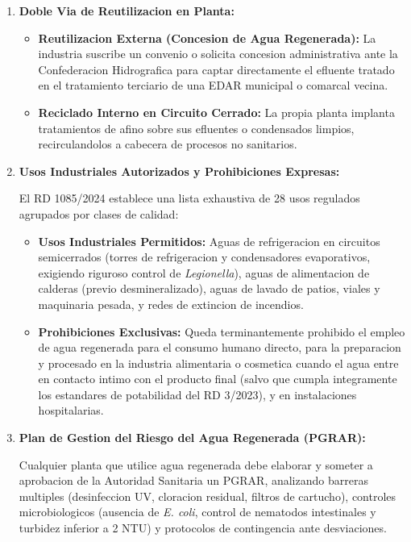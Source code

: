 \documentclass{report}
\begin{document}
\begin{enumerate}

    \item \textbf{Doble Via de Reutilizacion en Planta:}

    \begin{itemize}

        \item \textbf{Reutilizacion Externa (Concesion de Agua Regenerada):} La industria suscribe un convenio o solicita concesion administrativa ante la Confederacion Hidrografica para captar directamente el efluente tratado en el tratamiento terciario de una EDAR municipal o comarcal vecina.

        \item \textbf{Reciclado Interno en Circuito Cerrado:} La propia planta implanta tratamientos de afino sobre sus efluentes o condensados limpios, recirculandolos a cabecera de procesos no sanitarios.

    \end{itemize}

    \item \textbf{Usos Industriales Autorizados y Prohibiciones Expresas:}

    El RD 1085/2024 establece una lista exhaustiva de 28 usos regulados agrupados por clases de calidad:

    \begin{itemize}

        \item \textbf{Usos Industriales Permitidos:} Aguas de refrigeracion en circuitos semicerrados (torres de refrigeracion y condensadores evaporativos, exigiendo riguroso control de \textit{Legionella}), aguas de alimentacion de calderas (previo desmineralizado), aguas de lavado de patios, viales y maquinaria pesada, y redes de extincion de incendios.

        \item \textbf{Prohibiciones Exclusivas:} Queda terminantemente prohibido el empleo de agua regenerada para el consumo humano directo, para la preparacion y procesado en la industria alimentaria o cosmetica cuando el agua entre en contacto intimo con el producto final (salvo que cumpla integramente los estandares de potabilidad del RD 3/2023), y en instalaciones hospitalarias.

    \end{itemize}

    \item \textbf{Plan de Gestion del Riesgo del Agua Regenerada (PGRAR):}

    Cualquier planta que utilice agua regenerada debe elaborar y someter a aprobacion de la Autoridad Sanitaria un PGRAR, analizando barreras multiples (desinfeccion UV, cloracion residual, filtros de cartucho), controles microbiologicos (ausencia de \textit{E. coli}, control de nematodos intestinales y turbidez inferior a 2 NTU) y protocolos de contingencia ante desviaciones.

\end{enumerate}
\end{document}
